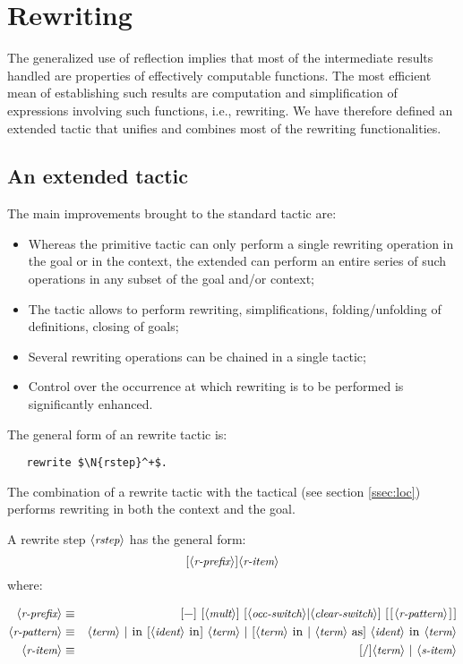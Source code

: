 \section{Rewriting}\label{sec:rw}
The generalized use of reflection implies that most of the
intermediate results handled are properties of effectively computable
functions. The most efficient mean of establishing such results are
computation and simplification of expressions involving such
functions, i.e., rewriting. We have therefore defined an extended
 tactic that unifies and combines most of the rewriting
functionalities.
\subsection{An extended  tactic}\label{ssec:extrw}
The main improvements brought to the standard \Coq{} 
tactic are:
\begin{itemize}
\item Whereas the primitive  tactic can only perform a
  single rewriting
operation in the goal or in the context, the extended 
can perform an entire series of such operations in any subset of the
goal and/or context;
\item The \ssr{}  tactic allows to perform rewriting,
  simplifications, folding/unfolding of definitions, closing of goals;
\item Several rewriting operations can be chained in a single tactic;
\item Control over the occurrence at which rewriting is to be performed is
  significantly enhanced.
\end{itemize}


The general form of an \ssr{} rewrite tactic is:
\begin{lstlisting}
   rewrite $\N{rstep}^+$.
\end{lstlisting}
The combination of a rewrite tactic with the  tactical (see
section \ref{ssec:loc}) performs rewriting in both the context and the
goal.

A rewrite step $\langle\mbox{\itshape\rmfamily\small rstep}\rangle$ has the general form:
$$[\langle\mbox{\itshape\rmfamily\small r-prefix}\rangle]\langle\mbox{\itshape\rmfamily\small r-item}\rangle$$
where:

\begin{eqnarray*}
\N{r-prefix} & \equiv &
[\C{-}]\ [\N{mult}]\ [\N{occ-switch} | \N{clear-switch}]\ [\C{[}\N{r-pattern}\C{]}]\\
\N{r-pattern} & \equiv &
   \N{term}\ |\ \C{in}\ [\N{ident}\ \C{in}]\ \N{term} \
   |\ [\N{term}\ \C{in}\ |\ \N{term}\ \C{as}]\ \N{ident}\ \C{in}\ \N{term}\\
\N{r-item} & \equiv &
 [\C{/}]\N{term} \ |\ \N{s-item} \\
\end{eqnarray*}


